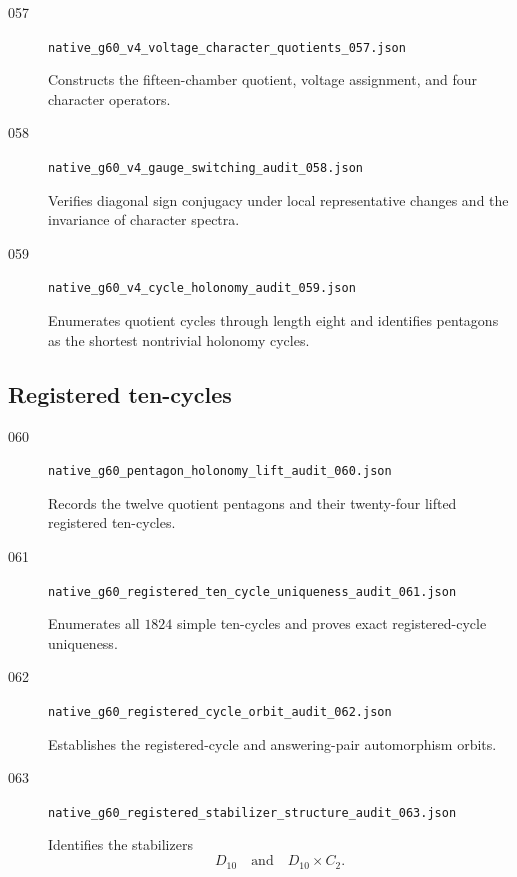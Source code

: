 \begin{description}
    \item[057]
    \texttt{native\_g60\_v4\_voltage\_character\_quotients\_057.json}

    Constructs the fifteen-chamber quotient, voltage assignment, and
    four character operators.

    \item[058]
    \texttt{native\_g60\_v4\_gauge\_switching\_audit\_058.json}

    Verifies diagonal sign conjugacy under local representative
    changes and the invariance of character spectra.

    \item[059]
    \texttt{native\_g60\_v4\_cycle\_holonomy\_audit\_059.json}

    Enumerates quotient cycles through length eight and identifies
    pentagons as the shortest nontrivial holonomy cycles.
\end{description}

\subsection{Registered ten-cycles}

\begin{description}
    \item[060]
    \texttt{native\_g60\_pentagon\_holonomy\_lift\_audit\_060.json}

    Records the twelve quotient pentagons and their twenty-four lifted
    registered ten-cycles.

    \item[061]
    \texttt{native\_g60\_registered\_ten\_cycle\_uniqueness\_audit\_061.json}

    Enumerates all \(1824\) simple ten-cycles and proves exact
    registered-cycle uniqueness.

    \item[062]
    \texttt{native\_g60\_registered\_cycle\_orbit\_audit\_062.json}

    Establishes the registered-cycle and answering-pair automorphism
    orbits.

    \item[063]
    \texttt{native\_g60\_registered\_stabilizer\_structure\_audit\_063.json}

    Identifies the stabilizers
    \[
    D_{10}
    \quad\text{and}\quad
    D_{10}\times C_2.
    \]
\end{description}

